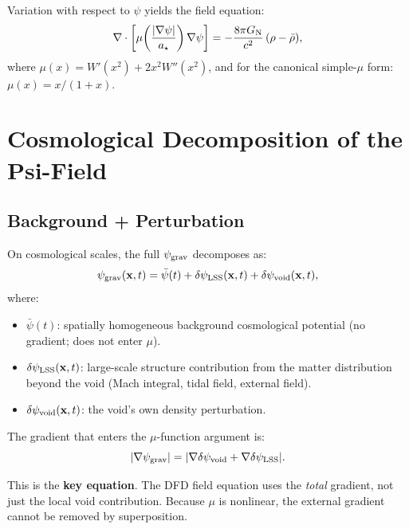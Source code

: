 \documentclass[11pt,a4paper]{article}
\newcommand{\astar}{a_\star}
\newcommand{\mufd}{\mu}
\newcommand{\psigrav}{\psi_{\rm grav}}
\newcommand{\GN}{G_{\rm N}}
\newcommand{\psifield}{\psi}
\newcommand{\Wfunc}{W}
\begin{document}
Variation with respect to $\psifield$ yields the field equation:
\begin{equation}
\nabla\cdot\left[\mufd\!\left(\frac{|\nabla\psifield|}{\astar}\right)
\nabla\psifield\right] = -\frac{8\pi\GN}{c^2}\,(\rho - \bar{\rho}),
\label{eq:field-eq}
\end{equation}
where $\mufd(x) = \Wfunc'(x^2) + 2x^2\Wfunc''(x^2)$, and for the
canonical simple-$\mufd$ form: $\mufd(x) = x/(1+x)$.


\section{Cosmological Decomposition of the Psi-Field}
\label{sec:cosmo-decomposition}

\subsection{Background + Perturbation}

On cosmological scales, the full $\psigrav$ decomposes as:
\begin{equation}
\psigrav(\mathbf{x},t) = \bar{\psi}(t) + \delta\psi_{\rm LSS}(\mathbf{x},t)
+ \delta\psi_{\rm void}(\mathbf{x},t),
\label{eq:psi-decomp}
\end{equation}
where:
\begin{itemize}[nosep]
\item $\bar{\psi}(t)$: spatially homogeneous background cosmological
  potential (no gradient; does not enter $\mufd$).
\item $\delta\psi_{\rm LSS}(\mathbf{x},t)$: large-scale structure
  contribution from the matter distribution beyond the void
  (Mach integral, tidal field, external field).
\item $\delta\psi_{\rm void}(\mathbf{x},t)$: the void's own density
  perturbation.
\end{itemize}

The gradient that enters the $\mufd$-function argument is:
\begin{equation}
|\nabla\psigrav| = |\nabla\delta\psi_{\rm void}
+ \nabla\delta\psi_{\rm LSS}|.
\label{eq:total-gradient}
\end{equation}

This is the \textbf{key equation}. The DFD field equation uses the
\emph{total} gradient, not just the local void contribution. Because
$\mufd$ is nonlinear, the external gradient cannot be removed by
superposition.
\end{document}
